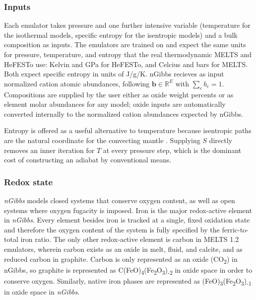 \subsubsection{Inputs}

Each emulator takes pressure and one further intensive variable (temperature
for the isothermal models, specific entropy for the isentropic models) and a bulk
composition as inputs. The emulators are trained on and expect the same units for pressure, temperature, and entropy that
the real thermodynamic MELTS and HeFESTo use: Kelvin and GPa for HeFESTo, and Celcius and bars for MELTS. Both expect specific 
entropy in units of J/g/K. nGibbs recieves as input normalized cation atomic abundances, following  $\mathbf{b}\in\mathbb{R}^{E}$ with $\sum_e b_e = 1$. 
Compositions are supplied by the user either as oxide weight percents or as element
molar abundances for any model; oxide inputs are automatically converted internally to the normalized cation abundances expected by nGibbs.

Entropy is offered as a useful alternative to temperature because isentropic paths are the
natural coordinate for the convecting mantle \citep{davies1977,brown1981,asimow1997,asimow2001,ganguly2005,tirone2016}. Supplying $S$ directly removes an inner iteration for $T$ at every pressure step, which is the dominant cost of constructing
an adiabat by conventional means.

\subsubsection{Redox state} \emph{nGibbs} models closed systems that conserve oxygen content, as well as open systems where oxygen fugacity is imposed. Iron is the major redox-active element in \emph{nGibbs}. Every element besides iron is tracked at a single, fixed oxidation state and therefore the oxygen content of the system is fully specified by the ferric-to-total iron ratio. The only other redox-active element is carbon in \textsc{MELTS} 1.2 emulators, wherein carbon exists as an oxide in melt, fluid, and calcite, and as reduced carbon in graphite. Carbon is only represented as an oxide (CO\textsubscript{2}) in nGibbs, so graphite is represented as C(FeO)\textsubscript{4}(Fe\textsubscript{2}O\textsubscript{3})\textsubscript{-2} in oxide space in order to conserve oxygen. Similarly, native iron phases are represented as (FeO)\textsubscript{3}(Fe\textsubscript{2}O\textsubscript{3})\textsubscript{-1} in oxide space in \emph{nGibbs}.


